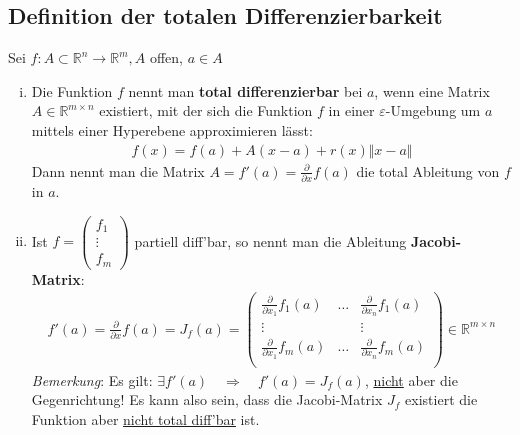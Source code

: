 \documentclass[11pt,a4paper]{book}
\newcommand {\Rn}	{\mathbb{R}^n}
\newcommand {\Rm}	{\mathbb{R}^m}
\newcommand {\Rmxn}	{\mathbb{R}^{m \times n}}
\newcommand{\1}    	{\mathbbm{1}}
\begin{document}
\subsection{Definition der totalen Differenzierbarkeit}
Sei \(f : A \subset \Rn \rightarrow \Rm, A\) offen, \(a \in A\)
\begin{enumerate}[(i)]
	\item Die Funktion \(f\) nennt man \textbf{total differenzierbar} bei \(a\), wenn eine Matrix \(A \in \Rmxn\) existiert, mit der sich die Funktion \(f\) in einer \(\varepsilon\)-Umgebung um \(a\) mittels einer Hyperebene approximieren lässt:
	\begin{align*}
		f(x) = f(a) + A(x-a) + r(x)\Vert x - a \Vert
	\end{align*}
	Dann nennt man die Matrix \(A = f'(a) = \frac{\partial}{\partial x} f(a)\) die total Ableitung von \(f\) in \(a\).
	\item Ist \(f = \left( \begin{array}{c} f_1 \\ \vdots \\ f_m \end{array} \right) \) partiell diff'bar, so nennt man die Ableitung \textbf{Jacobi-Matrix}:
	\begin{align*}
		f'(a) = \frac{\partial}{\partial x} f(a) = J_f(a) = \left( \begin{array}{ccc}
			\frac{\partial}{\partial x_1} f_1(a) & \hdots & \frac{\partial}{\partial x_n} f_1(a) \\
			\vdots & & \vdots \\
			\frac{\partial}{\partial x_1} f_m(a) & \hdots & \frac{\partial}{\partial x_n} f_m(a) \\
		\end{array} \right) \in \Rmxn
	\end{align*}
	\textit{Bemerkung}: Es gilt: \( \exists f'(a) \quad \Rightarrow \quad f'(a) = J_f(a) \), \underline{nicht} aber die Gegenrichtung! Es kann also sein, dass die Jacobi-Matrix \(J_f\) existiert die Funktion aber \underline{nicht total diff'bar} ist.
\end{enumerate}
\end{document}
